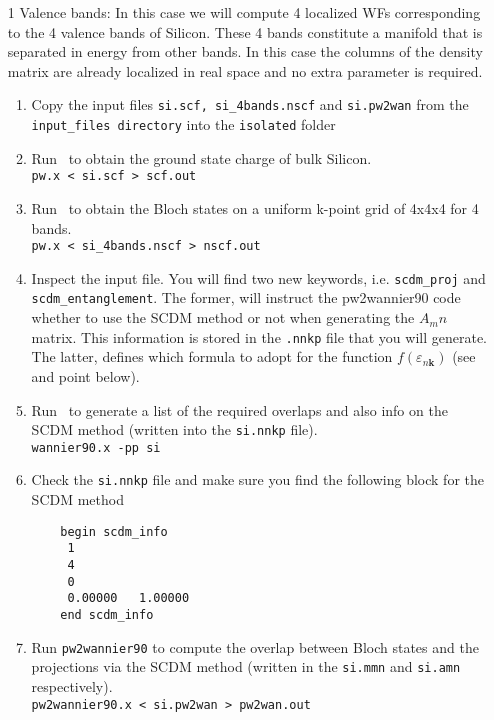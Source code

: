 \documentclass[a4paper,11pt,twoside]{article}
\begin{document}
\begin{itemize}
  \item[1]{Valence bands: In this case we will compute 4 localized WFs corresponding to the 4 valence bands of Silicon. These 4 bands constitute a manifold that is separated in energy from other bands. In this case the columns of the density matrix are already localized in real space and no extra parameter is required.}
  \begin{enumerate}
    \item Copy the input files {\tt si.scf, si\_4bands.nscf} and {\tt si.pw2wan} from the {\tt input\_files directory} into the {\tt isolated} folder
    \item Run \pwscf\ to obtain the ground state charge of bulk Silicon. \\
    {\tt pw.x < si.scf > scf.out}

    \item Run \pwscf\ to obtain the Bloch states on a uniform k-point grid of 4x4x4 for 4 bands. \\
    {\tt pw.x < si\_4bands.nscf > nscf.out}
    
    \item Inspect the \wannier input file. You will find two new keywords, i.e. {\tt scdm\_proj} and {\tt scdm\_entanglement}. The former, will instruct the pw2wannier90 code whether to use the SCDM method or not when generating the $A_mn$ matrix. This information is stored in the {\tt .nnkp} file that you will generate. The latter, defines which formula to adopt for the function $f(\varepsilon_{n\mathbf{k}})$ (see \cite{LinLin-ArXiv2017} and point below).
    \item Run \wannier\ to generate a list of the required overlaps and also info on the SCDM method (written
    into the {\tt si.nnkp} file).\\ 
    {\tt wannier90.x -pp si}
    \item Check the {\tt si.nnkp} file and make sure you find the following block for the SCDM method
    \begin{verbatim}
    begin scdm_info
     1
     4
     0
     0.00000   1.00000
    end scdm_info
    \end{verbatim}

    \item Run {\tt pw2wannier90} to compute the overlap between Bloch
    states and the projections via the SCDM method (written in the
    {\tt si.mmn} and {\tt si.amn} respectively).\\  
    {\tt pw2wannier90.x < si.pw2wan > pw2wan.out}


\end{enumerate}
\end{itemize}
\end{document}
